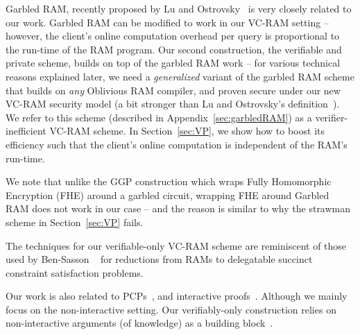 Garbled RAM, recently proposed by Lu and Ostrovsky~\cite{LO12}
is very closely related to our work.
Garbled RAM can be modified to work in our VC-RAM setting --
however, the client's online computation overhead per query
is proportional to the run-time of the RAM program.
Our second construction, the verifiable
and private scheme,
builds on top of the garbled RAM work -- 
for various technical reasons explained later, 
we need a {\it generalized} variant 
of the garbled RAM scheme 
that builds on {\it any} Oblivious RAM compiler, and 
proven secure under 
our new VC-RAM security model  
(a bit stronger than Lu and Ostrovsky's definition~\cite{LO12}).
We refer to this scheme (described in Appendix~\ref{sec:garbledRAM})
as a verifier-inefficient VC-RAM scheme. In 
Section~\ref{sec:VP}, we show how to boost its efficiency
such that the client's online computation is  
independent of the RAM's run-time.

We note that unlike the GGP construction which wraps 
Fully Homomorphic Encryption (FHE) around a garbled circuit,  
wrapping FHE around Garbled RAM does not  
work in our case -- and the reason is similar to 
why the strawman scheme in Section~\ref{sec:VP} fails.

The techniques for our verifiable-only 
VC-RAM scheme are reminiscent of those used by Ben-Sasson 
\etal~\cite{RAMtocircuit}
for reductions from RAMs to delegatable 
succinct constraint satisfaction problems.

Our work is also related to PCPs~\cite{BFLS91,FGL96,pcp,ALM98,Kil92,Kil95}, 
and interactive proofs~\cite{LFKN92,Sha92,babai85,GMR85,GMR89}.
Although we mainly focus on the non-interactive setting.
Our verifiably-only construction relies 
on non-interactive arguments (of knowledge) as 
a building block~\cite{Mic94,Mic00,FS87,BCCT12,GLR11,DFH12,spanprogram}.

